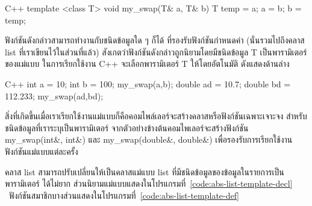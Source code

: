 \latintext
\begin{codelist}{C++}{}
template <class T> 
void my_swap(T& a, T& b)
{
  T temp = a;  a = b;  b = temp;
}
\end{codelist}
\thaitext

ฟังก์ชัน{\wbr}ดังกล่าว{\wbr}สามารถ{\wbr}ทำงาน{\wbr}กับ{\wbr}ชนิด{\wbr}ข้อมูล{\wbr}ใด ๆ ก็ได้ ที่{\wbr}รองรับ{\wbr}ฟังก์ชัน{\wbr}กำหนด{\wbr}ค่า{\wbr}
(นั่น{\wbr}รวม{\wbr}ไป{\wbr}ถึง{\wbr}ค{\wbr}ลา{\wbr}ส list ที่{\wbr}เรา{\wbr}เขียน{\wbr}ไว้{\wbr}ใน{\wbr}ส่วน{\wbr}ที่แล้ว)
สังเกต{\wbr}ว่า{\wbr}ฟังก์ชัน{\wbr}ดังกล่าว{\wbr}ถูก{\wbr}นิยาม{\wbr}โดย{\wbr}มี{\wbr}ชนิด{\wbr}ข้อมูล {\ct T} เป็น{\wbr}พารามิเตอร์{\wbr}ของ{\wbr}แม่แบบ{\wbr}
ใน{\wbr}การ{\wbr}เรียก{\wbr}ใช้{\wbr}งาน C++ จะ{\wbr}เลือก{\wbr}พารามิเตอร์ {\ct T} ให้{\wbr}โดย{\wbr}อัตโนมัติ ดัง{\wbr}แสดง{\wbr}ด้าน{\wbr}ล่าง{\wbr}

\latintext
\begin{codelist}{C++}{}
  int a = 10; int b = 100;
  my_swap(a,b);
  double ad = 10.7; double bd = 112.233;
  my_swap(ad,bd);
\end{codelist}
\thaitext

สิ่ง{\wbr}ที่{\wbr}เกิด{\wbr}ขึ้น{\wbr}เมื่อ{\wbr}เรา{\wbr}เรียก{\wbr}ใช้{\wbr}งาน{\wbr}แม่แบบ{\wbr}ก็{\wbr}คือ{\wbr}คอมไพล์{\wbr}เลอร์{\wbr}จะ{\wbr}สร้าง{\wbr}ค{\wbr}ลา{\wbr}ส{\wbr}หรือ{\wbr}ฟังก์ชัน{\wbr}เฉพาะเจาะจง{\wbr}
สำหรับ{\wbr}ชนิด{\wbr}ข้อมูล{\wbr}ที่{\wbr}เรา{\wbr}ระบุ{\wbr}เป็น{\wbr}พารามิเตอร์ จาก{\wbr}ตัวอย่าง{\wbr}ข้างต้น{\wbr}คอม{\wbr}ไพ{\wbr}เลอร์{\wbr}จะ{\wbr}สร้าง{\wbr}ฟังก์ชัน{\wbr}
{\ct my\_swap(int\&, int\&)} และ {\ct my\_swap(double\&, double\&)}
เพื่อ{\wbr}รองรับ{\wbr}การ{\wbr}เรียก{\wbr}ใช้{\wbr}งาน{\wbr}ฟังก์ชัน{\wbr}แม่แบบ{\wbr}แต่ละ{\wbr}ครั้ง{\wbr}

ค{\wbr}ลา{\wbr}ส {\ct list} สามารถ{\wbr}ปรับ{\wbr}เปลี่ยน{\wbr}ให้{\wbr}เป็น{\wbr}ค{\wbr}ลา{\wbr}ส{\wbr}แม่แบบ {\ct list}
ที่{\wbr}มี{\wbr}ชนิด{\wbr}ข้อมูล{\wbr}ของ{\wbr}ข้อมูล{\wbr}ใน{\wbr}รายการ{\wbr}เป็น{\wbr}พารามิเตอร์ ได้{\wbr}ไม่{\wbr}ยาก{\wbr}
ส่วน{\wbr}นิยาม{\wbr}แม่แบบ{\wbr}แสดง{\wbr}ใน{\wbr}โปรแกรม{\wbr}ที่~\ref{code:abs-list-template-decl}
\ ฟังก์ชัน{\wbr}สมาชิก{\wbr}บาง{\wbr}ส่วน{\wbr}แสดง{\wbr}ใน{\wbr}โปรแกรม{\wbr}ที่~\ref{code:abs-list-template-def}

